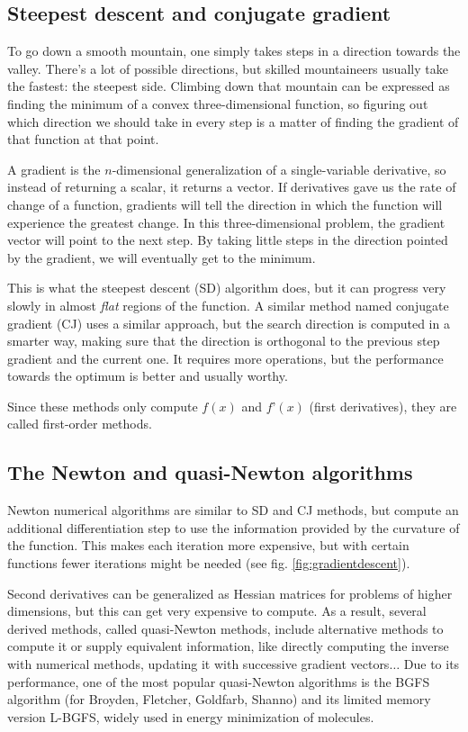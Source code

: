 \subsection{Steepest descent and conjugate gradient}
To go down a smooth mountain, one simply takes steps in a direction towards the valley. There’s a lot of possible directions, but skilled mountaineers usually take the fastest: the steepest side. Climbing down that mountain can be expressed as finding the minimum of a convex three-dimensional function, so figuring out which direction we should take in every step is a matter of finding the gradient of that function at that point.

A gradient is the $n$-dimensional generalization of a single-variable derivative, so instead of returning a scalar, it returns a vector. If derivatives gave us the rate of change of a function, gradients will tell the direction in which the function will experience the greatest change. In this three-dimensional problem, the gradient vector will point to the next step. By taking little steps in the direction pointed by the gradient, we will eventually get to the minimum.

This is what the steepest descent (SD) algorithm does, but it can progress very slowly in almost \textit{flat} regions of the function. A similar method named conjugate gradient (CJ) uses a similar approach, but the search direction is computed in a smarter way, making sure that the direction is orthogonal to the previous step gradient and the current one. It requires more operations, but the performance towards the optimum is better and usually worthy.

Since these methods only compute $f(x)$ and $f’(x)$ (first derivatives), they are called first-order methods.

\subsection{The Newton and quasi-Newton algorithms}
Newton numerical algorithms are similar to SD and CJ methods, but compute an additional differentiation step to use the information provided by the curvature of the function. This makes each iteration more expensive, but with certain functions fewer iterations might be needed (see fig. \ref{fig:gradientdescent}).

Second derivatives can be generalized as Hessian matrices for problems of higher dimensions, but this can get very expensive to compute. As a result, several derived methods, called quasi-Newton methods, include alternative methods to compute it or supply equivalent information, like directly computing the inverse with numerical methods, updating it with successive gradient vectors$ \ldots $  Due to its performance, one of the most popular quasi-Newton algorithms is the BGFS algorithm (for Broyden, Fletcher, Goldfarb, Shanno) and its limited memory version L-BGFS, widely used in energy minimization of molecules.

